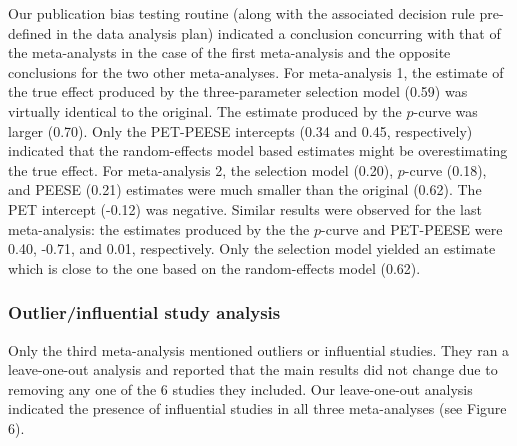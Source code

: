 \documentclass[
  man,floatsintext]{apa6}
\begin{document}
Our publication bias testing routine (along with the associated decision rule pre-defined in the data analysis plan) indicated a conclusion concurring with that of the meta-analysts in the case of the first meta-analysis and the opposite conclusions for the two other meta-analyses. For meta-analysis 1, the estimate of the true effect produced by the three-parameter selection model (0.59) was virtually identical to the original. The estimate produced by the \(p\)-curve was larger (0.70). Only the PET-PEESE intercepts (0.34 and 0.45, respectively) indicated that the random-effects model based estimates might be overestimating the true effect. For meta-analysis 2, the selection model (0.20), \(p\)-curve (0.18), and PEESE (0.21) estimates were much smaller than the original (0.62). The PET intercept (-0.12) was negative. Similar results were observed for the last meta-analysis: the estimates produced by the the \(p\)-curve and PET-PEESE were 0.40, -0.71, and 0.01, respectively. Only the selection model yielded an estimate which is close to the one based on the random-effects model (0.62).

\hypertarget{outlierinfluential-study-analysis-1}{%
\subsubsection{Outlier/influential study analysis}\label{outlierinfluential-study-analysis-1}}

Only the third meta-analysis mentioned outliers or influential studies. They ran a leave-one-out analysis and reported that the main results did not change due to removing any one of the 6 studies they included. Our leave-one-out analysis indicated the presence of influential studies in all three meta-analyses (see Figure 6).
\end{document}
